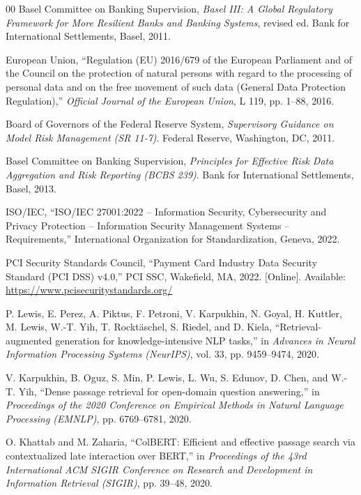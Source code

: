 \documentclass[conference]{IEEEtran}
\begin{document}
\begin{thebibliography}{00}
Basel Committee on Banking Supervision, \textit{Basel III: A Global Regulatory Framework for More Resilient Banks and Banking Systems}, revised ed. Bank for International Settlements, Basel, 2011.

European Union, ``Regulation (EU) 2016/679 of the European Parliament and of the Council on the protection of natural persons with regard to the processing of personal data and on the free movement of such data (General Data Protection Regulation),'' \textit{Official Journal of the European Union}, L 119, pp. 1--88, 2016.

Board of Governors of the Federal Reserve System, \textit{Supervisory Guidance on Model Risk Management (SR 11-7)}. Federal Reserve, Washington, DC, 2011.

Basel Committee on Banking Supervision, \textit{Principles for Effective Risk Data Aggregation and Risk Reporting (BCBS 239)}. Bank for International Settlements, Basel, 2013.

ISO/IEC, ``ISO/IEC 27001:2022 -- Information Security, Cybersecurity and Privacy Protection -- Information Security Management Systems -- Requirements,'' International Organization for Standardization, Geneva, 2022.

PCI Security Standards Council, ``Payment Card Industry Data Security Standard (PCI DSS) v4.0,'' PCI SSC, Wakefield, MA, 2022. [Online]. Available: \url{https://www.pcisecuritystandards.org/}

P. Lewis, E. Perez, A. Piktus, F. Petroni, V. Karpukhin, N. Goyal, H. Kuttler, M. Lewis, W.-T. Yih, T. Rockt{\"a}schel, S. Riedel, and D. Kiela, ``Retrieval-augmented generation for knowledge-intensive NLP tasks,'' in \textit{Advances in Neural Information Processing Systems (NeurIPS)}, vol. 33, pp. 9459--9474, 2020.

V. Karpukhin, B. Oguz, S. Min, P. Lewis, L. Wu, S. Edunov, D. Chen, and W.-T. Yih, ``Dense passage retrieval for open-domain question answering,'' in \textit{Proceedings of the 2020 Conference on Empirical Methods in Natural Language Processing (EMNLP)}, pp. 6769--6781, 2020.

O. Khattab and M. Zaharia, ``ColBERT: Efficient and effective passage search via contextualized late interaction over BERT,'' in \textit{Proceedings of the 43rd International ACM SIGIR Conference on Research and Development in Information Retrieval (SIGIR)}, pp. 39--48, 2020.


\end{thebibliography}
\end{document}
